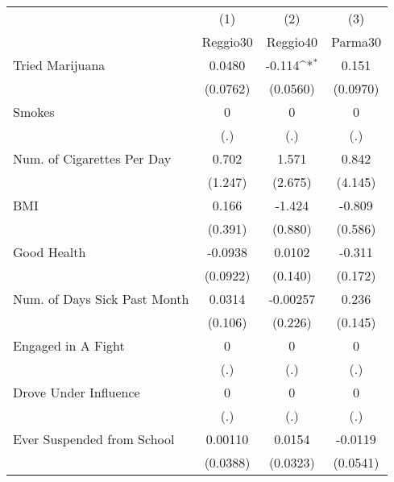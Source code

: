 {
\def\sym#1{\ifmmode^{#1}\else\(^{#1}\)\fi}
\begin{tabular}{l*{3}{c}}
\hline\hline
            &\multicolumn{1}{c}{(1)}&\multicolumn{1}{c}{(2)}&\multicolumn{1}{c}{(3)}\\
            &\multicolumn{1}{c}{Reggio30}&\multicolumn{1}{c}{Reggio40}&\multicolumn{1}{c}{Parma30}\\
\hline
Tried Marijuana&      0.0480         &      -0.114\sym{*}  &       0.151         \\
            &    (0.0762)         &    (0.0560)         &    (0.0970)         \\
[1em]
Smokes      &           0         &           0         &           0         \\
            &         (.)         &         (.)         &         (.)         \\
[1em]
Num. of Cigarettes Per Day&       0.702         &       1.571         &       0.842         \\
            &     (1.247)         &     (2.675)         &     (4.145)         \\
[1em]
BMI         &       0.166         &      -1.424         &      -0.809         \\
            &     (0.391)         &     (0.880)         &     (0.586)         \\
[1em]
Good Health &     -0.0938         &      0.0102         &      -0.311         \\
            &    (0.0922)         &     (0.140)         &     (0.172)         \\
[1em]
Num. of Days Sick Past Month&      0.0314         &    -0.00257         &       0.236         \\
            &     (0.106)         &     (0.226)         &     (0.145)         \\
[1em]
Engaged in A Fight&           0         &           0         &           0         \\
            &         (.)         &         (.)         &         (.)         \\
[1em]
Drove Under Influence&           0         &           0         &           0         \\
            &         (.)         &         (.)         &         (.)         \\
[1em]
Ever Suspended from School&     0.00110         &      0.0154         &     -0.0119         \\
            &    (0.0388)         &    (0.0323)         &    (0.0541)         \\

\end{tabular}}
